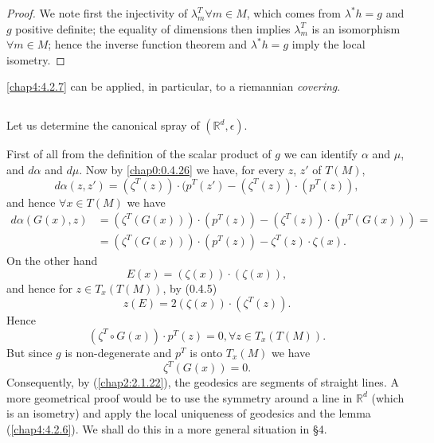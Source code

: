 \begin{proof}
We note first the injectivity of $\lambda^{T}_{m}\forall m\in M$,
which comes from $\lambda^{\ast}h=g$ and $g$ positive definite; the
equality of dimensions then implies $\lambda^{T}_{m}$ is an
isomorphism $\forall m\in M$; hence the inverse function theorem and
$\lambda^{\ast}h=g$ imply the local isometry.
\end{proof}

\begin{remark*}
\ref{chap4:4.2.7} can \pageoriginale be applied, in particular, to a riemannian {\em
  covering}. 
\end{remark*}

\subsection{}\label{chap4:4.2.8}

\begin{example*}
Let us determine the canonical spray of $(\mathbb{R}^{d},\epsilon)$.
\end{example*}

First of all from the definition of the scalar product of $g$ we can
identify $\alpha$ and $\mu$, and $d\alpha$ and $d\mu$. Now by
\eqref{chap0:0.4.26} we have, for every $z$, $z'$ of $T(M)$,
$$
d\alpha(z,z')=(\zeta^{T}(z))\cdot (p^{T}(z')-(\zeta^{T}(z))\cdot (p^{T}(z)),
$$
and hence $\forall x\in T(M)$ we have
\begin{align*}
d\alpha (G(x),z) &= (\zeta^{T}(G(x)))\cdot
(p^{T}(z))-(\zeta^{T}(z))\cdot (p^{T}(G(x)))=\\
&= (\zeta^{T}(G(x)))\cdot (p^{T}(z))-\zeta^{T}(z)\cdot \zeta(x).
\end{align*}
On the other hand
$$
E(x)=(\zeta(x))\cdot (\zeta(x)),
$$
and hence for $z\in T_{x}(T(M))$, by (0.4.5)
$$
z(E)=2(\zeta(x))\cdot(\zeta^{T}(z)).
$$
Hence
$$
(\zeta^{T}\circ G(x))\cdot p^{T}(z)=0,\forall z\in T_{x}(T(M)).
$$
But since $g$ is non-degenerate and $p^{T}$ is onto $T_{x}(M)$ we have
\begin{equation*}
\zeta^{T}(G(x))=0.\tag{4.2.9}\label{chap4:4.2.9}
\end{equation*}
Consequently, by (\eqref{chap2:2.1.22}), the geodesics are segments of
straight lines. A more geometrical proof would be to use the symmetry
around a line in $\mathbb{R}^{d}$ (which is an isometry) and apply the
local uniqueness of geodesics and the lemma (\ref{chap4:4.2.6}). We
shall do this in a more general situation in \S 4.


